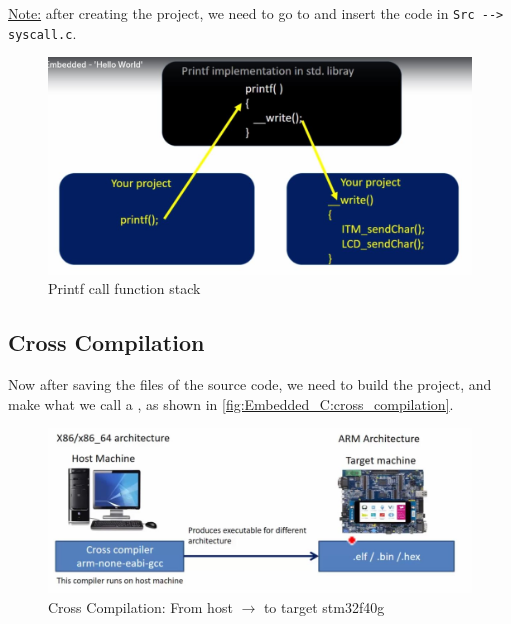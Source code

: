 \newpage
\underline{Note:} after creating the project, we need to go to  and insert the code in \verb|Src --> syscall.c|.

\begin{figure}[h]
\centering
\includegraphics[scale=0.5]{Figures/Embedded_C/printf_debug_function_call}
\caption{Printf call function stack}
\label{fig:Embedded_C:printf_debug_function_call}
\end{figure} 

\subsection{Cross Compilation}

Now after saving the files of the source code, we need to build the project, and make what we call a , as shown in \autoref{fig:Embedded_C:cross_compilation}.

\begin{figure}[h]
\centering
\includegraphics[scale=0.5]{Figures/Embedded_C/cross_compilation}
\caption{Cross Compilation: From host $\rightarrow$ to target stm32f40g}
\label{fig:Embedded_C:cross_compilation}
\end{figure} 

